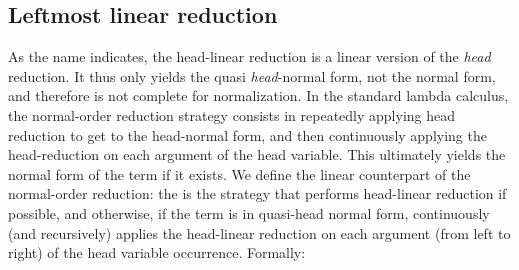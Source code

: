 \documentclass{elsarticle}
\theoremstyle{plain}
\theoremstyle{definition}
\begin{document}
\subsection{Leftmost linear reduction}

As the name indicates, the head-linear reduction is a linear version of the
\emph{head} reduction. It thus only yields the quasi \emph{head}-normal form,
not the normal form, and therefore is not complete for normalization.
In the standard lambda calculus, the normal-order reduction strategy consists in
repeatedly applying head reduction to get to the head-normal form,
 and then continuously applying the head-reduction on each argument of the head variable.
This ultimately yields the normal form of the term if it exists.
We define the linear counterpart of the normal-order reduction:
 the  is the strategy that performs
 head-linear reduction if possible, and otherwise, if the term is in quasi-head
  normal form, continuously (and recursively) applies the head-linear reduction
  on each argument (from left to right) of the head variable occurrence.
Formally:
\end{document}

